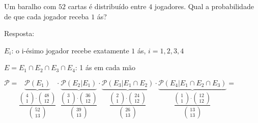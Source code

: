 \documentclass[a4paper]{article}
\begin{document}
	\noindent Um baralho com $52$ cartas é distribuído entre $4$ jogadores. Qual a probabilidade de que cada jogador receba $1$ ás?
	
	Resposta:
	
	$E_{i}$: o i-ésimo jogador recebe exatamente $1$ ás, $i=1,2,3,4$
	
	$E=E_{1} \cap E_{2} \cap E_{3} \cap E_{4}$: 1 ás em cada mão
	
	$\mathcal{P} = \underbrace{\mathcal{P}(E_{1})}_{\dfrac{\begin{pmatrix}
			4 \\
			1
			\end{pmatrix} \cdot \begin{pmatrix}
			48 \\
			12
			\end{pmatrix}}{\begin{pmatrix}
			52 \\
			13
			\end{pmatrix}}} \cdot \underbrace{\mathcal{P}(E_{2}|E_{1})}_{\dfrac{\begin{pmatrix}
			3 \\
			1
			\end{pmatrix} \cdot \begin{pmatrix}
			36 \\
			12
			\end{pmatrix}}{\begin{pmatrix}
			39 \\
			13
			\end{pmatrix}}} \cdot \underbrace{\mathcal{P}(E_{3}|E_{1} \cap E_{2})}_{\dfrac{\begin{pmatrix}
			2 \\
			1
			\end{pmatrix} \cdot \begin{pmatrix}
			24 \\
			12
			\end{pmatrix}}{\begin{pmatrix}
			26 \\
			13
			\end{pmatrix}}} \cdot \underbrace{\mathcal{P}(E_{4}|E_{1} \cap E_{2} \cap E_{3})}_{\dfrac{\begin{pmatrix}
			1 \\
			1
			\end{pmatrix} \cdot \begin{pmatrix}
			12 \\
			12
			\end{pmatrix}}{\begin{pmatrix}
			13 \\
			13
			\end{pmatrix}}} = $
	
\end{document}
